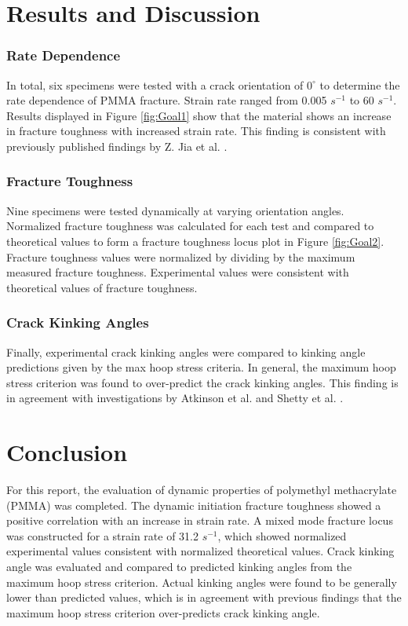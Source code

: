 \documentclass[12pt]{article}
\begin{document}
\section{Results and Discussion} %
\subsubsection*{Rate Dependence}
In total, six specimens were tested with a crack orientation of $0^{\circ}$ to determine the rate dependence of PMMA fracture. Strain rate ranged from 0.005 $s^{-1}$ to 60 $s^{-1}$. Results displayed in Figure \ref{fig:Goal1} show that the material shows an increase in fracture toughness with increased strain rate. This finding is consistent with previously published findings by Z. Jia et al. \cite{Jia}. 
\subsubsection*{Fracture Toughness}
Nine specimens were tested dynamically at varying orientation angles. Normalized fracture toughness was calculated for each test and compared to theoretical values to form a fracture toughness locus plot in Figure \ref{fig:Goal2}. Fracture toughness values were normalized by dividing by the maximum measured fracture toughness. Experimental values were consistent with theoretical values of fracture toughness. 
\subsubsection*{Crack Kinking Angles}
Finally, experimental crack kinking angles were compared to kinking angle predictions given by the max hoop stress criteria. In general, the maximum hoop stress criterion was found to over-predict the crack kinking angles. This finding is in agreement with investigations by Atkinson et al. and Shetty et al. \cite{Atkinson} \cite{Shetty}.

\section{Conclusion} %
For this report, the evaluation of dynamic properties of polymethyl methacrylate (PMMA) was completed. The dynamic initiation fracture toughness showed a positive correlation with an increase in strain rate. A mixed mode fracture locus was constructed for a strain rate of 31.2 $s^{-1}$, which showed normalized experimental values consistent with normalized theoretical values. Crack kinking angle was evaluated and compared to predicted kinking angles from the maximum hoop stress criterion. Actual kinking angles were found to be generally lower than predicted values, which is in agreement with previous findings that the maximum hoop stress criterion over-predicts crack kinking angle.
\end{document}
